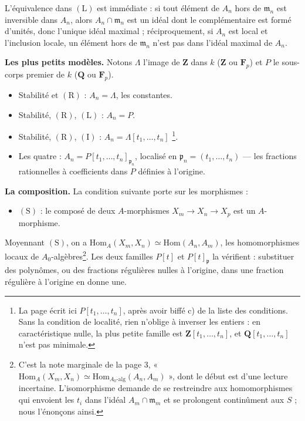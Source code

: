 \documentclass[11pt,a4paper]{article}
\begin{document}
L'équivalence dans $(\mathrm{L})$ est immédiate : si tout élément de $A_n$ hors
de $\mathfrak{m}_n$ est inversible dans $A_n$, alors $A_n \cap \mathfrak{m}_n$ est
un idéal dont le complémentaire est formé d'unités, donc l'unique idéal
maximal ; réciproquement, si $A_n$ est local et l'inclusion locale, un élément
hors de $\mathfrak{m}_n$ n'est pas dans l'idéal maximal de $A_n$.

\textbf{Les plus petits modèles.} Notons $\Lambda$ l'image de $\mathbf{Z}$ dans
$k$ ($\mathbf{Z}$ ou $\mathbf{F}_p$) et $P$ le sous-corps premier de $k$
($\mathbf{Q}$ ou $\mathbf{F}_p$).

\begin{itemize}
  \item Stabilité et $(\mathrm{R})$ : $A_n = \Lambda$, les constantes.
  \item Stabilité, $(\mathrm{R})$, $(\mathrm{L})$ : $A_n = P$.
  \item Stabilité, $(\mathrm{R})$, $(\mathrm{I})$ : $A_n = \Lambda[t_1, \ldots, t_n]$
    \footnote{La page écrit ici $P[t_1, \ldots, t_n]$, après avoir biffé
    c) de la liste des conditions. Sans la condition de localité, rien
    n'oblige à inverser les entiers : en caractéristique nulle, la plus petite
    famille est $\mathbf{Z}[t_1, \ldots, t_n]$, et $\mathbf{Q}[t_1, \ldots, t_n]$
    n'est pas minimale.}.
  \item Les quatre : $A_n = P[t_1, \ldots, t_n]_{\mathfrak{p}_n}$, localisé en
    $\mathfrak{p}_n = (t_1, \ldots, t_n)$ — les fractions rationnelles à
    coefficients dans $P$ définies à l'origine.
\end{itemize}

\textbf{La composition.} La condition suivante porte sur les morphismes :

\begin{itemize}
  \item $(\mathrm{S})$ : le composé de deux $A$-morphismes
    $X_m \to X_n \to X_p$ est un $A$-morphisme.
\end{itemize}

Moyennant $(\mathrm{S})$, on a
$\mathrm{Hom}_A(X_m, X_n) \simeq \mathrm{Hom}(A_n, A_m)$, les homomorphismes
locaux de $A_0$-algèbres\footnote{C'est la note marginale de la page 3,
« $\mathrm{Hom}_A(X_m, X_n) \simeq \mathrm{Hom}_{A_0\text{-alg}}(A_n, A_m)$ »,
dont le début est d'une lecture incertaine. L'isomorphisme demande de se
restreindre aux homomorphismes qui envoient les $t_i$ dans l'idéal
$A_m \cap \mathfrak{m}_m$ et se prolongent continûment aux $S$ ; nous l'énonçons
ainsi.}. Les deux familles $P[t]$ et $P[t]_{\mathfrak{p}}$ la vérifient :
substituer des polynômes, ou des fractions régulières nulles à l'origine,
dans une fraction régulière à l'origine en donne une.
\end{document}
